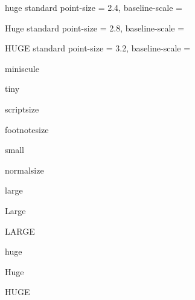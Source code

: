  {huge} {standard}
  {
    point-size     = \ScaleToNearestTenthPoint {\NormalPointSize} {2.4},
    baseline-scale = \NormalBaselineScale
  }

 {Huge} {standard}
  {
    point-size     = \ScaleToNearestTenthPoint {\NormalPointSize} {2.8},
    baseline-scale = \NormalBaselineScale
  }

 {HUGE} {standard}
  {
    point-size     = \ScaleToNearestTenthPoint {\NormalPointSize} {3.2},
    baseline-scale = \NormalBaselineScale
  }




%

\NewDocumentCommand \miniscule {}
  { {miniscule}}

\NewDocumentCommand \tiny {}
  { {tiny}}

\NewDocumentCommand \scriptsize {}
  { {scriptsize}}

\NewDocumentCommand \footnotesize {}
  { {footnotesize}}

\NewDocumentCommand \small {}
  { {small}}

\RenewDocumentCommand \normalsize {}
  { {normalsize}}

\NewDocumentCommand \large {}
  { {large}}

\NewDocumentCommand \Large {}
  { {Large}}

\NewDocumentCommand \LARGE {}
  { {LARGE}}

\NewDocumentCommand \huge {}
  { {huge}}

\NewDocumentCommand \Huge {}
  { {Huge}}

\NewDocumentCommand \HUGE {}
  { {HUGE}}
